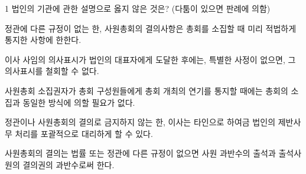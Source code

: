 \begin{question}{1}
법인의 기관에 관한 설명으로 옳지 않은 것은? (다툼이 있으면 판례에 의함)
\begin{choices}
  \item 정관에 다른 규정이 없는 한, 사원총회의 결의사항은 총회를 소집할 때 미리 적법하게 통지한 사항에 한한다.
  \item 이사 사임의 의사표시가 법인의 대표자에게 도달한 후에는, 특별한 사정이 없으면, 그 의사표시를 철회할 수 없다.
  \item 사원총회 소집권자가 총회 구성원들에게 총회 개최의 연기를 통지할 때에는 총회의 소집과 동일한 방식에 의할 필요가 없다.
  \item 정관이나 사원총회의 결의로 금지하지 않는 한, 이사는 타인으로 하여금 법인의 제반사무 처리를 포괄적으로 대리하게 할 수 있다.
  \item 사원총회의 결의는 법률 또는 정관에 다른 규정이 없으면 사원 과반수의 출석과 출석사원의 결의권의 과반수로써 한다.
\end{choices}
\end{question}
